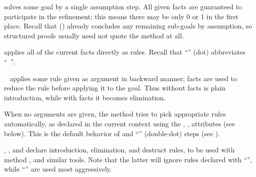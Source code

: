 \begin{isabellebody}
\begin{isamarkuptext}
\begin{description}
  \item \hyperlink{method.assumption}{\mbox{}} solves some goal by a single assumption
  step.  All given facts are guaranteed to participate in the
  refinement; this means there may be only 0 or 1 in the first place.
  Recall that \hyperlink{command.qed}{\mbox{}} () already
  concludes any remaining sub-goals by assumption, so structured
  proofs usually need not quote the \hyperlink{method.assumption}{\mbox{}} method at
  all.
  
  \item \hyperlink{method.this}{\mbox{}} applies all of the current facts directly as
  rules.  Recall that ``\hyperlink{command.dot}{\mbox{\isa{\isacommand{{\isachardot}}}}}'' (dot) abbreviates ``\hyperlink{command.by}{\mbox{}}~''.
  
  \item \hyperlink{method.rule}{\mbox{}}~ applies some rule given as
  argument in backward manner; facts are used to reduce the rule
  before applying it to the goal.  Thus \hyperlink{method.rule}{\mbox{}} without facts
  is plain introduction, while with facts it becomes elimination.
  
  When no arguments are given, the \hyperlink{method.rule}{\mbox{}} method tries to pick
  appropriate rules automatically, as declared in the current context
  using the \hyperlink{attribute.Pure.intro}{\mbox{}}, \hyperlink{attribute.Pure.elim}{\mbox{}},
  \hyperlink{attribute.Pure.dest}{\mbox{}} attributes (see below).  This is the
  default behavior of \hyperlink{command.proof}{\mbox{}} and ``\hyperlink{command.ddot}{\mbox{\isa{\isacommand{{\isachardot}{\isachardot}}}}}'' 
  (double-dot) steps (see ).
  
  \item \hyperlink{attribute.Pure.intro}{\mbox{}}, \hyperlink{attribute.Pure.elim}{\mbox{}}, and
  \hyperlink{attribute.Pure.dest}{\mbox{}} declare introduction, elimination, and
  destruct rules, to be used with method \hyperlink{method.rule}{\mbox{}}, and similar
  tools.  Note that the latter will ignore rules declared with
  ``\isa{{\isachardoublequote}{\isacharquery}{\isachardoublequote}}'', while ``\isa{{\isachardoublequote}{\isacharbang}{\isachardoublequote}}''  are used most aggressively.
  

\end{description}
\end{isamarkuptext}
\end{isabellebody}
